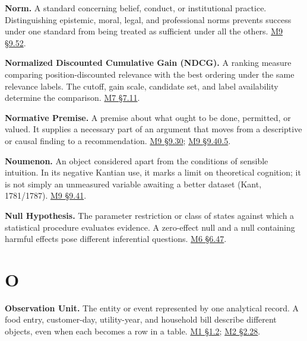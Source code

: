 \noindent\textbf{Norm.} A standard concerning belief, conduct, or institutional
practice. Distinguishing epistemic, moral, legal, and professional norms
prevents success under one standard from being treated as sufficient
under all the others.
\hyperref[M09-truth-warrant-and-the-different-force-of-norms]{M9
§9.52}.

\noindent\textbf{Normalized Discounted Cumulative Gain (NDCG).} A ranking measure
comparing position-discounted relevance with the best ordering under the
same relevance labels. The cutoff, gain scale, candidate set, and label
availability determine the comparison.
\href{Marketing_Analytics_Lecture_Notes.pdf\#M07-ranking-metrics-depend-on-position-and-available-labels}{M7
§7.11}.

\noindent\textbf{Normative Premise.} A premise about what ought to be done,
permitted, or valued. It supplies a necessary part of an argument that
moves from a descriptive or causal finding to a recommendation.
\hyperref[M09-what-a-company-ought-to-do]{M9
§9.30};
\hyperref[M09-from-a-conditional-result-to-an-ought-conclusion]{M9
§9.40.5}.

\noindent\textbf{Noumenon.} An object considered apart from the conditions of
sensible intuition. In its negative Kantian use, it marks a limit on
theoretical cognition; it is not simply an unmeasured variable awaiting
a better dataset (Kant, 1781/1787).
\hyperref[M09-phenomena-noumena-and-the-ends-of-analysis]{M9
§9.41}.

\noindent\textbf{Null Hypothesis.} The parameter restriction or class of states
against which a statistical procedure evaluates evidence. A zero-effect
null and a null containing harmful effects pose different inferential
questions.
\href{Marketing_Analytics_Lecture_Notes.pdf\#M06-choosing-the-null-for-a-claim-about-harm}{M6
§6.47}.

\par{}
\hypertarget{module-o}{%
\section*{O}\label{module-o}}

\noindent\textbf{Observation Unit.} The entity or event represented by one
analytical record. A food entry, customer-day, utility-year, and
household bill describe different objects, even when each becomes a row
in a table.
\href{Marketing_Analytics_Lecture_Notes.pdf\#M01-the-unit-of-observation-determines-the-calculation}{M1
§1.2};
\href{Marketing_Analytics_Lecture_Notes.pdf\#M02-electricity-prices-household-bills-and-the-unit-of-harm}{M2
§2.28}.

